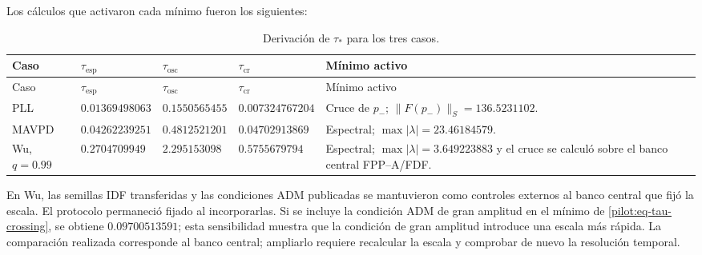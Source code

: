 Los cálculos que activaron cada mínimo fueron los siguientes:
\begingroup
\footnotesize
\begin{longtable}{@{}L{2.0cm}C{2.25cm}C{2.25cm}C{2.25cm}L{4.4cm}@{}}
\caption{Derivación de $\tau_*$ para los tres casos.}
\label{pilot:tab-tau-star}\\
\toprule
Caso & $\tau_{\mathrm{esp}}$ & $\tau_{\mathrm{osc}}$ &
$\tau_{\mathrm{cr}}$ & Mínimo activo\\
\midrule
\endfirsthead
\toprule
Caso & $\tau_{\mathrm{esp}}$ & $\tau_{\mathrm{osc}}$ &
$\tau_{\mathrm{cr}}$ & Mínimo activo\\
\midrule
\endhead
PLL & $0.01369498063$ & $0.1550565455$ & $0.007324767204$ &
Cruce de $p_-$; $\lVert F(p_-)\rVert_S=136.5231102$.\\
MAVPD & $0.04262239251$ & $0.4812521201$ & $0.04702913869$ &
Espectral; $\max|\lambda|=23.46184579$.\\
Wu, $q=0.99$ & $0.2704709949$ & $2.295153098$ & $0.5755679794$ &
Espectral; $\max|\lambda|=3.649223883$ y el cruce se calculó sobre el banco
central FPP--A/FDF.\\
\bottomrule
\end{longtable}
\endgroup

En Wu, las semillas IDF transferidas y las condiciones ADM publicadas se
mantuvieron como controles externos al banco central que fijó la escala. El
protocolo permaneció fijado al incorporarlas. Si se incluye la
condición ADM de gran amplitud en el mínimo de
\eqref{pilot:eq-tau-crossing}, se obtiene $0.09700513591$; esta sensibilidad
muestra que la condición de gran amplitud introduce una escala más rápida.
La comparación realizada corresponde al banco central; ampliarlo requiere
recalcular la escala y comprobar de nuevo la resolución temporal.


